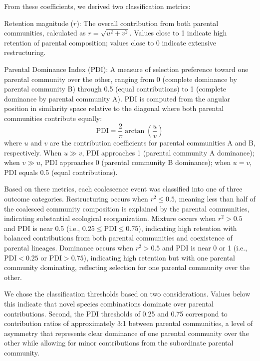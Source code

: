 From these coefficients, we derived two classification metrics:

Retention magnitude ($r$): The overall contribution from both parental communities, calculated as $r = \sqrt{u^2 + v^2}$. Values close to 1 indicate high retention of parental composition; values close to 0 indicate extensive restructuring.

Parental Dominance Index (PDI): A measure of selection preference toward one parental community over the other, ranging from 0 (complete dominance by parental community B) through 0.5 (equal contributions) to 1 (complete dominance by parental community A). PDI is computed from the angular position in similarity space relative to the diagonal where both parental communities contribute equally:
\begin{equation}
\text{PDI} = \frac{2}{\pi} \arctan\left(\frac{u}{v}\right)
\label{eq:pdi}
\end{equation}
where $u$ and $v$ are the contribution coefficients for parental communities A and B, respectively. When $u \gg v$, PDI approaches 1 (parental community A dominance); when $v \gg u$, PDI approaches 0 (parental community B dominance); when $u = v$, PDI equals 0.5 (equal contributions).

Based on these metrics, each coalescence event was classified into one of three outcome categories. Restructuring occurs when $r^2 \leq 0.5$,  meaning less than half of the coalesced community composition is explained by the parental communities, indicating substantial ecological reorganization. Mixture occurs when $r^2 > 0.5$ and PDI is near 0.5 (i.e., $0.25 \leq \text{PDI} \leq 0.75$), indicating high retention with balanced contributions from both parental communities and coexistence of parental lineages. Dominance occurs when $r^2 > 0.5$ and PDI is near 0 or 1 (i.e., $\text{PDI} < 0.25$ or $\text{PDI} > 0.75$), indicating high retention but with one parental community dominating, reflecting selection for one parental community over the other.

We chose the classification thresholds based on two considerations.  Values below this indicate that novel species combinations dominate over parental contributions. Second, the PDI thresholds of 0.25 and 0.75 correspond to contribution ratios of approximately 3:1 between parental communities, a level of asymmetry that represents clear dominance of one parental community over the other while allowing for minor contributions from the subordinate parental community.


